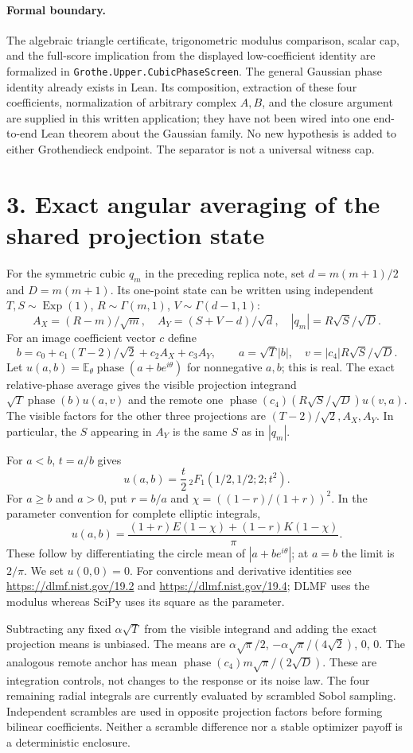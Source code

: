 \documentclass[11pt]{article}
\newcommand{\E}{\mathbb E}
\newcommand{\ph}{\operatorname{phase}}
\begin{document}
\paragraph{Formal boundary.}
The algebraic triangle certificate, trigonometric modulus comparison, scalar
cap, and the full-score implication from the displayed low-coefficient identity
are formalized in \texttt{Grothe.Upper.CubicPhaseScreen}. The general Gaussian
phase identity already exists in Lean. Its composition, extraction of these four
coefficients, normalization of arbitrary complex $A,B$, and the closure argument
are supplied in this written application; they have not been wired into one
end-to-end Lean theorem about the Gaussian family. No new hypothesis is added
to either Grothendieck endpoint. The separator is not a universal witness cap.

\section*{3. Exact angular averaging of the shared projection state}
For the symmetric cubic $q_m$ in the preceding replica note, set
$d=m(m+1)/2$ and $D=m(m+1)$. Its one-point state can be written using independent
$T,S\sim\operatorname{Exp}(1)$, $R\sim\Gamma(m,1)$, $V\sim\Gamma(d-1,1)$:
\[
 A_X=(R-m)/\sqrt m,\quad A_Y=(S+V-d)/\sqrt d,\quad |q_m|=R\sqrt S/\sqrt D.
\]
For an image coefficient vector $c$ define
\[
 b=c_0+c_1(T-2)/\sqrt2+c_2 A_X+c_3 A_Y,
 \qquad a=\sqrt T|b|,\quad v=|c_4|R\sqrt S/\sqrt D.
\]
Let $u(a,b)=\E_\theta\ph(a+be^{i\theta})$ for nonnegative $a,b$; this is real.
The exact relative-phase average gives the visible projection integrand
$\sqrt T\ph(b)u(a,v)$ and the remote one
$\ph(c_4)(R\sqrt S/\sqrt D)u(v,a)$. The visible factors for the other three
projections are $(T-2)/\sqrt2,A_X,A_Y$. In particular, the $S$ appearing in
$A_Y$ is the same $S$ as in $|q_m|$.

For $a<b$, $t=a/b$ gives
\[
 u(a,b)=\frac t2\,{}_2F_1(1/2,1/2;2;t^2).
\]
For $a\ge b$ and $a>0$, put $r=b/a$ and $\chi=((1-r)/(1+r))^2$. In the
parameter convention for complete elliptic integrals,
\[
 u(a,b)=\frac{(1+r)E(1-\chi)+(1-r)K(1-\chi)}\pi.
\]
These follow by differentiating the circle mean of $|a+be^{i\theta}|$;
at $a=b$ the limit is $2/\pi$. We set $u(0,0)=0$. For conventions and derivative
identities see \url{https://dlmf.nist.gov/19.2} and
\url{https://dlmf.nist.gov/19.4}; DLMF uses the modulus whereas SciPy uses its
square as the parameter.

Subtracting any fixed $\alpha\sqrt T$ from the visible integrand and adding
the exact projection means is unbiased. The means are
$\alpha\sqrt\pi/2$, $-\alpha\sqrt\pi/(4\sqrt2)$, $0$, $0$.
The analogous remote anchor has mean
$\ph(c_4)m\sqrt\pi/(2\sqrt D)$.
These are integration controls, not changes to the response or its noise law.
The four remaining radial integrals are currently evaluated by scrambled Sobol
sampling. Independent scrambles are used in opposite projection factors before
forming bilinear coefficients. Neither a scramble difference nor a stable
optimizer payoff is a deterministic enclosure.
\end{document}
